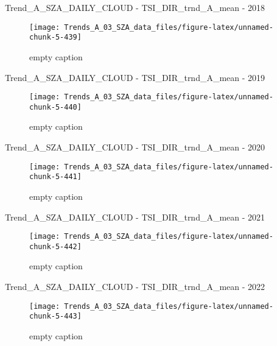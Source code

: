 \documentclass[
  10pt,
  a4paper,oneside]{article}
\begin{document}
Trend\_A\_SZA\_DAILY\_CLOUD - TSI\_DIR\_trnd\_A\_mean - 2018

\begin{figure}[!ht]

{\centering \texttt{[image: Trends\_A\_03\_SZA\_data\_files/figure-latex/unnamed-chunk-5-439]} 

}

\caption{ empty caption }\label{fig:unnamed-chunk-5-439}
\end{figure}

Trend\_A\_SZA\_DAILY\_CLOUD - TSI\_DIR\_trnd\_A\_mean - 2019

\begin{figure}[!ht]

{\centering \texttt{[image: Trends\_A\_03\_SZA\_data\_files/figure-latex/unnamed-chunk-5-440]} 

}

\caption{ empty caption }\label{fig:unnamed-chunk-5-440}
\end{figure}

Trend\_A\_SZA\_DAILY\_CLOUD - TSI\_DIR\_trnd\_A\_mean - 2020

\begin{figure}[!ht]

{\centering \texttt{[image: Trends\_A\_03\_SZA\_data\_files/figure-latex/unnamed-chunk-5-441]} 

}

\caption{ empty caption }\label{fig:unnamed-chunk-5-441}
\end{figure}

Trend\_A\_SZA\_DAILY\_CLOUD - TSI\_DIR\_trnd\_A\_mean - 2021

\begin{figure}[!ht]

{\centering \texttt{[image: Trends\_A\_03\_SZA\_data\_files/figure-latex/unnamed-chunk-5-442]} 

}

\caption{ empty caption }\label{fig:unnamed-chunk-5-442}
\end{figure}

Trend\_A\_SZA\_DAILY\_CLOUD - TSI\_DIR\_trnd\_A\_mean - 2022

\begin{figure}[!ht]

{\centering \texttt{[image: Trends\_A\_03\_SZA\_data\_files/figure-latex/unnamed-chunk-5-443]} 

}

\caption{ empty caption }\label{fig:unnamed-chunk-5-443}
\end{figure}
\end{document}
